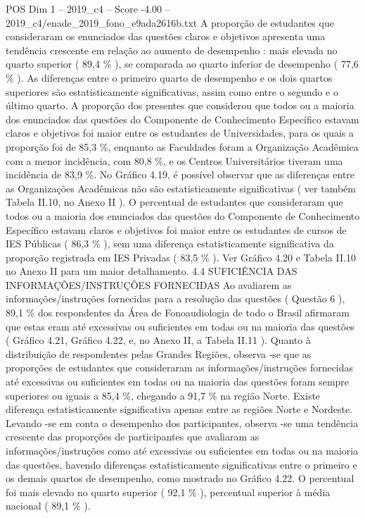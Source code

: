 \begin{textsample}{POS Dim 1 – 2019\_c4 – Score -4.00 – 2019\_c4/enade\_2019\_fono\_e9ada2616b.txt}
A proporção de estudantes que consideraram os enunciados das questões claros e objetivos apresenta uma tendência crescente em relação ao aumento de desempenho : mais elevada no quarto superior ( 89,4 \% ), se comparada ao quarto inferior de desempenho ( 77,6 \% ).
As diferenças entre o primeiro quarto de desempenho e os dois quartos superiores são estatisticamente significativas, assim como entre o segundo e o último quarto.
A proporção dos presentes que considerou que todos ou a maioria dos enunciados das questões do Componente de Conhecimento Específico estavam claros e objetivos foi maior entre os estudantes de Universidades, para os quais a proporção foi de 85,3 \%, enquanto as Faculdades foram a Organização Acadêmica com a menor incidência, com 80,8 \%, e os Centros Universitários tiveram uma incidência de 83,9 \%.
No Gráfico 4.19, é possível observar que as diferenças entre as Organizações Acadêmicas não são estatisticamente significativas ( ver também Tabela II.10, no Anexo II ).
O percentual de estudantes que consideraram que todos ou a maioria dos enunciados das questões do Componente de Conhecimento Específico estavam claros e objetivos foi maior entre os estudantes de cursos de IES Públicas ( 86,3 \% ), sem uma diferença estatisticamente significativa da proporção registrada em IES Privadas ( 83,5 \% ).
Ver Gráfico 4.20 e Tabela II.10 no Anexo II para um maior detalhamento. 4.4 SUFICIÊNCIA DAS INFORMAÇÕES/INSTRUÇÕES FORNECIDAS Ao avaliarem as informações/instruções fornecidas para a resolução das questões ( Questão 6 ), 89,1 \% dos respondentes da Área de Fonoaudiologia de todo o Brasil afirmaram que estas eram até excessivas ou suficientes em todas ou na maioria das questões ( Gráfico 4.21, Gráfico 4.22, e, no Anexo II, a Tabela II.11 ).
Quanto à distribuição de respondentes pelas Grandes Regiões, observa -se que as proporções de estudantes que consideraram as informações/instruções fornecidas até excessivas ou suficientes em todas ou na maioria das questões foram sempre superiores ou iguais a 85,4 \%, chegando a 91,7 \% na região Norte.
Existe diferença estatisticamente significativa apenas entre as regiões Norte e Nordeste.
Levando -se em conta o desempenho dos participantes, observa -se uma tendência crescente das proporções de participantes que avaliaram as informações/instruções como até excessivas ou suficientes em todas ou na maioria das questões, havendo diferenças estatisticamente significativas entre o primeiro e os demais quartos de desempenho, como mostrado no Gráfico 4.22.
O percentual foi mais elevado no quarto superior ( 92,1 \% ), percentual superior à média nacional ( 89,1 \% ).

\end{textsample}
